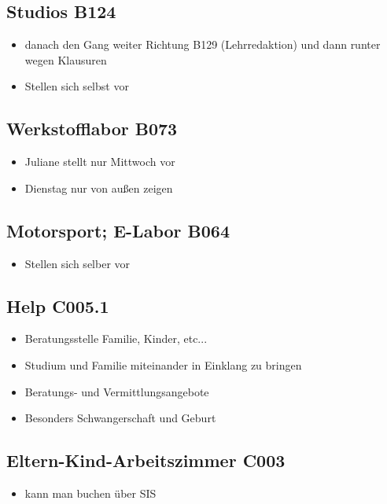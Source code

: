 \documentclass[11pt,ngerman]{scrartcl}
\begin{document}
\subsection*{Studios B124}
\begin{itemize}
    \item danach den Gang weiter Richtung B129 (Lehrredaktion) und dann runter wegen Klausuren
    \item Stellen sich selbst vor
\end{itemize}

\subsection*{Werkstofflabor B073}
\begin{itemize}
    \item Juliane stellt nur Mittwoch vor
    \item Dienstag nur von außen zeigen
\end{itemize}

\subsection*{Motorsport; E-Labor B064}
\begin{itemize}
    \item Stellen sich selber vor
\end{itemize}

\subsection*{Help C005.1}
\begin{itemize}
    \item Beratungsstelle Familie, Kinder, etc...
    \item Studium und Familie miteinander in Einklang zu bringen
    \item Beratungs- und Vermittlungsangebote
    \item Besonders Schwangerschaft und Geburt
\end{itemize}

\subsection*{Eltern-Kind-Arbeitszimmer C003}
\begin{itemize}
    \item kann man buchen über SIS
\end{itemize}
\end{document}
